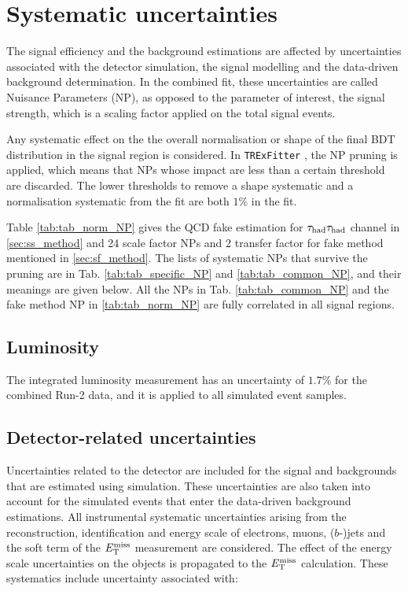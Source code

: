 \section{Systematic uncertainties}
\label{sec:systematics}
The signal efficiency and the background estimations are affected by uncertainties associated with the detector simulation, the signal modelling and the data-driven background determination. In the combined fit, these uncertainties are called Nuisance Parameters (NP), as opposed to the parameter of interest, the signal strength, which is a scaling factor applied on the total signal events.

Any systematic effect on the the overall normalisation or shape of the final BDT distribution in the signal region is considered. In \texttt{TRExFitter} \cite{TRExFitter}, the NP pruning is applied, which means that NPs whose impact are less than a certain threshold are discarded. The lower thresholds to remove a shape systematic and a normalisation systematic from the fit are both $1\%$ in the fit.

Table \ref{tab:tab_norm_NP} gives the QCD fake estimation for $\tau_\text{had}{}\tau_\text{had}$ channel in \ref{sec:ss_method} and 24 scale factor NPs and 2 transfer factor for fake method mentioned in \ref{sec:sf_method}.
The lists of systematic NPs that survive the pruning are in Tab. \ref{tab:tab_specific_NP} and \ref{tab:tab_common_NP}, and their meanings are given below. All the NPs in Tab. \ref{tab:tab_common_NP} and the fake method NP in \ref{tab:tab_norm_NP} are fully correlated in all signal regions.

%

\subsection{Luminosity}
\label{sec:systematic_Luminosity}
The integrated luminosity measurement has an uncertainty of $1.7\%$ for the combined Run-2 data, and it is applied to all simulated event samples.

\subsection{Detector-related uncertainties}
\label{sec:syst_det}

Uncertainties related to the detector are included for the signal and backgrounds that are estimated using simulation. These uncertainties are also taken into account for the simulated events that enter the data-driven background estimations. All instrumental systematic uncertainties arising from the reconstruction, identification and energy scale of electrons, muons, ($b$-)jets and the soft term of the $E_{\text{T}}^{\text{miss}}$ measurement are considered. The effect of the energy scale uncertainties on the objects is propagated to the $E_{\text{T}}^{\text{miss}}$ calculation. These systematics include uncertainty associated with:

